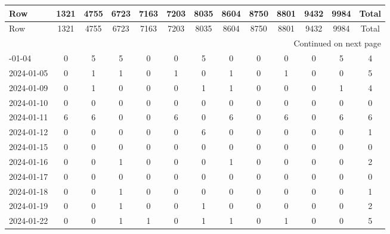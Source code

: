 \documentclass[dvipdfmx,oneside]{article}
\begin{document}
\begingroup
\footnotesize
\begin{longtable}{lcccccccccccc}
\toprule
               Row &  1321 &  4755 &  6723 &  7163 &  7203 &  8035 &  8604 &  8750 &  8801 &  9432 &  9984 &  Total \\
\midrule
\endfirsthead

\toprule
               Row &  1321 &  4755 &  6723 &  7163 &  7203 &  8035 &  8604 &  8750 &  8801 &  9432 &  9984 &  Total \\
\midrule
\endhead
\midrule
\multicolumn{13}{r}{{Continued on next page}} \\
\midrule
\endfoot

\bottomrule
\endlastfoot
        2024-01-04 &     0 &     5 &     5 &     0 &     0 &     5 &     0 &     0 &     0 &     0 &     5 &      4 \\
        2024-01-05 &     0 &     1 &     1 &     0 &     1 &     0 &     1 &     0 &     1 &     0 &     0 &      5 \\
        2024-01-09 &     0 &     1 &     0 &     0 &     0 &     1 &     1 &     0 &     0 &     0 &     1 &      4 \\
        2024-01-10 &     0 &     0 &     0 &     0 &     0 &     0 &     0 &     0 &     0 &     0 &     0 &      0 \\
        2024-01-11 &     6 &     6 &     0 &     0 &     6 &     0 &     6 &     0 &     6 &     0 &     6 &      6 \\
        2024-01-12 &     0 &     0 &     0 &     0 &     0 &     6 &     0 &     0 &     0 &     0 &     0 &      1 \\
        2024-01-15 &     0 &     0 &     0 &     0 &     0 &     0 &     0 &     0 &     0 &     0 &     0 &      0 \\
        2024-01-16 &     0 &     0 &     1 &     0 &     0 &     0 &     1 &     0 &     0 &     0 &     0 &      2 \\
        2024-01-17 &     0 &     0 &     0 &     0 &     0 &     0 &     0 &     0 &     0 &     0 &     0 &      0 \\
        2024-01-18 &     0 &     0 &     1 &     0 &     0 &     0 &     0 &     0 &     0 &     0 &     0 &      1 \\
        2024-01-19 &     0 &     0 &     1 &     0 &     0 &     1 &     0 &     0 &     0 &     0 &     0 &      2 \\
        2024-01-22 &     0 &     0 &     1 &     1 &     0 &     1 &     1 &     0 &     1 &     0 &     0 &      5 \\

\end{longtable}
\end{document}
